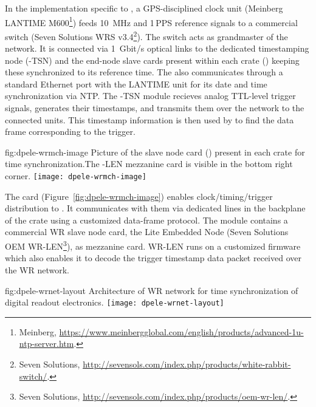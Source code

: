 In the implementation specific to , a GPS-disciplined 
clock unit (Meinberg LANTIME M600\footnote{Meinberg\texttrademark{}, \url{https://www.meinbergglobal.com/english/products/advanced-1u-ntp-server.htm}.}) feeds \SI{10}{MHz} and \num{1}\,PPS reference signals to a commercial  switch (Seven Solutions WRS v3.4\footnote{Seven Solutions\texttrademark{}, \url{http://sevensols.com/index.php/products/white-rabbit-switch/}.}). The switch acts as grandmaster of the  network. It is connected via \SI{1}{Gbit/s} optical links to the dedicated  timestamping node (-TSN) and the  end-node slave cards present within each  crate () keeping these synchronized to its reference time. The  also communicates through a standard Ethernet port with the LANTIME unit for its date and time synchronization via NTP. The -TSN module recieves analog TTL-level trigger signals, generates their timestamps, and transmits them over the  network to the connected  units. This timestamp information is then used by  to find the data frame corresponding to the trigger. 

\begin{dunefigure}{fig:dpele-wrmch-image}
{Picture of the  slave node card () present in each  crate for time synchronization.The -LEN mezzanine card is visible in the bottom right corner.}
\texttt{[image: dpele-wrmch-image]}
\end{dunefigure}

The  card (Figure~\ref{fig:dpele-wrmch-image}) enables clock/timing/trigger distribution to . It communicates with them via dedicated lines in the backplane of the  crate using a customized data-frame protocol. The module contains a commercial WR slave node card, the  Lite Embedded Node (Seven Solutions OEM WR-LEN\footnote{Seven Solutions\texttrademark{}, \url{http://sevensols.com/index.php/products/oem-wr-len/}.}), as mezzanine card. WR-LEN runs on a customized firmware which also enables it to decode the trigger timestamp data packet received over the WR network.

\begin{dunefigure}{fig:dpele-wrnet-layout}
{Architecture of WR network for time synchronization of digital readout electronics.}
\texttt{[image: dpele-wrnet-layout]}
\end{dunefigure}

